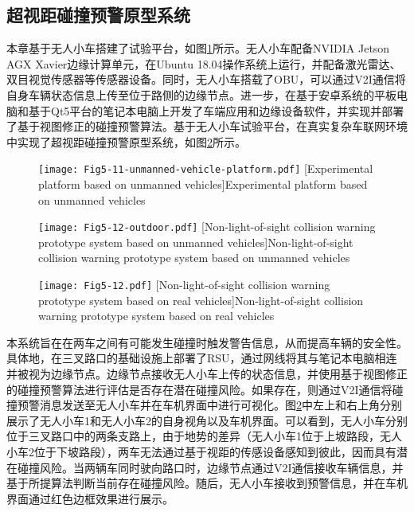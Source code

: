 \subsection{超视距碰撞预警原型系统}

本章基于无人小车搭建了试验平台，如图\ref{fig 5-10}所示。无人小车配备NVIDIA Jetson AGX Xavier边缘计算单元，在Ubuntu 18.04操作系统上运行，并配备激光雷达、双目视觉传感器等传感器设备。同时，无人小车搭载了OBU，可以通过V2I通信将自身车辆状态信息上传至位于路侧的边缘节点。进一步，在基于安卓系统的平板电脑和基于Qt5平台的笔记本电脑上开发了车端应用和边缘设备软件，并实现并部署了基于视图修正的碰撞预警算法。基于无人小车试验平台，在真实复杂车联网环境中实现了超视距碰撞预警原型系统，如图\ref{fig 5-11}所示。

\begin{figure}[h]
\centering
  \texttt{[image: Fig5-11-unmanned-vehicle-platform.pdf]}
  [Experimental platform based on unmanned vehicles]{Experimental platform based on unmanned vehicles}
  \label{fig 5-10}
\end{figure}

\begin{figure}[h]
\centering
  \texttt{[image: Fig5-12-outdoor.pdf]}
  [Non-light-of-sight collision warning prototype system based on unmanned vehicles]{Non-light-of-sight collision warning prototype system based on unmanned vehicles}
  \label{fig 5-11}
\end{figure}

\begin{figure}[h] 
	\centering
	\texttt{[image: Fig5-12.pdf]}
	[Non-light-of-sight collision warning prototype system based on real vehicles]{Non-light-of-sight collision warning prototype system based on real vehicles}
	\label{fig 5-12}
\end{figure}

本系统旨在在两车之间有可能发生碰撞时触发警告信息，从而提高车辆的安全性。具体地，在三叉路口的基础设施上部署了RSU，通过网线将其与笔记本电脑相连并被视为边缘节点。边缘节点接收无人小车上传的状态信息，并使用基于视图修正的碰撞预警算法进行评估是否存在潜在碰撞风险。如果存在，则通过V2I通信将碰撞预警消息发送至无人小车并在车机界面中进行可视化。图\ref{fig 5-11}中左上和右上角分别展示了无人小车1和无人小车2的自身视角以及车机界面。可以看到，无人小车分别位于三叉路口中的两条支路上，由于地势的差异（无人小车1位于上坡路段，无人小车2位于下坡路段），两车无法通过基于视距的传感设备感知到彼此，因而具有潜在碰撞风险。当两辆车同时驶向路口时，边缘节点通过V2I通信接收车辆信息，并基于所提算法判断当前存在碰撞风险。随后，无人小车接收到预警信息，并在车机界面通过红色边框效果进行展示。

